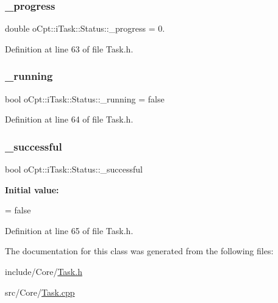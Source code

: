 \subsubsection{\texorpdfstring{\+\_\+progress}{\_progress}}
{\footnotesize\ttfamily double o\+Cpt\+::i\+Task\+::\+Status\+::\+\_\+progress = 0.\hspace{0.3cm}{\ttfamily [private]}}



Definition at line 63 of file Task.\+h.

\hypertarget{classo_cpt_1_1i_task_1_1_status_ab9896a94738163478468028599a8e4f7}{}\label{classo_cpt_1_1i_task_1_1_status_ab9896a94738163478468028599a8e4f7} 
\subsubsection{\texorpdfstring{\+\_\+running}{\_running}}
{\footnotesize\ttfamily bool o\+Cpt\+::i\+Task\+::\+Status\+::\+\_\+running = false\hspace{0.3cm}{\ttfamily [private]}}



Definition at line 64 of file Task.\+h.

\hypertarget{classo_cpt_1_1i_task_1_1_status_acac4794c074b5483c0c05f68c3689df9}{}\label{classo_cpt_1_1i_task_1_1_status_acac4794c074b5483c0c05f68c3689df9} 
\subsubsection{\texorpdfstring{\+\_\+successful}{\_successful}}
{\footnotesize\ttfamily bool o\+Cpt\+::i\+Task\+::\+Status\+::\+\_\+successful\hspace{0.3cm}{\ttfamily [private]}}

{\bfseries Initial value\+:}
\begin{DoxyCode}
=
                    \textcolor{keyword}{false}
\end{DoxyCode}


Definition at line 65 of file Task.\+h.



The documentation for this class was generated from the following files\+:\begin{DoxyCompactItemize}
\item 
include/\+Core/\hyperlink{_task_8h}{Task.\+h}\item 
src/\+Core/\hyperlink{_task_8cpp}{Task.\+cpp}\end{DoxyCompactItemize}
